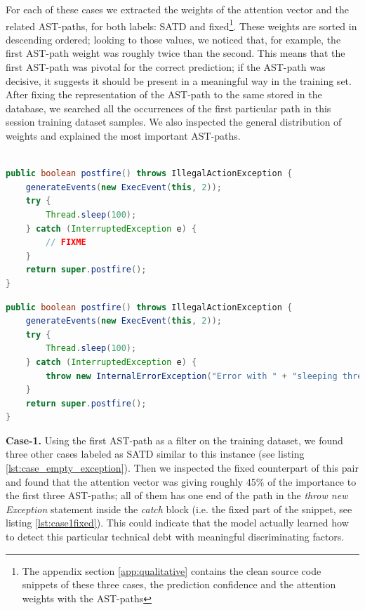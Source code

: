 For each of these cases we extracted the weights of the attention vector and the related AST-paths, for both labels: SATD and fixed\footnote{The appendix section \ref{app:qualitative} contains the clean source code snippets of these three cases, the prediction confidence and the attention weights with the AST-paths}. These weights are sorted in descending ordered; looking to those values, we noticed that, for example, the first AST-path weight was roughly twice than the second. This means that the first AST-path was pivotal for the correct prediction; if the AST-path was decisive, it suggests it should be present in a meaningful way in the training set. After fixing the representation of the AST-path to the same stored in the database, we searched all the occurrences of the first particular path in this session training dataset samples. We also inspected the general distribution of weights and explained the most important AST-paths.


\begin{lstlisting}[caption={Case-1 SATD, verbatim source code}, label={lst:case_empty_exception},language=Java]

public boolean postfire() throws IllegalActionException {
    generateEvents(new ExecEvent(this, 2));
    try {
        Thread.sleep(100);
    } catch (InterruptedException e) {
        // FIXME
    }
    return super.postfire();
}

\end{lstlisting}

\begin{lstlisting}[caption={Case-1 fixed, verbatim source code}, label={lst:case1fixed},language=Java]
public boolean postfire() throws IllegalActionException {
    generateEvents(new ExecEvent(this, 2));
    try {
        Thread.sleep(100);
    } catch (InterruptedException e) {
        throw new InternalErrorException("Error with " + "sleeping thread in postfire");
    }
    return super.postfire();
}
\end{lstlisting}


\textbf{Case-1.} Using the first AST-path as a filter on the training dataset, we found three other cases labeled as SATD similar to this instance (see listing \ref{lst:case_empty_exception}). Then we inspected the fixed counterpart of this pair and found that the attention vector was giving roughly 45\% of the importance to the first three AST-paths; all of them has one end of the path in the \textit{throw new Exception} statement inside the \textit{catch} block (i.e. the fixed part of the snippet, see listing \ref{lst:case1fixed}). This could indicate that the model actually learned how to detect this particular technical debt with meaningful discriminating factors.


